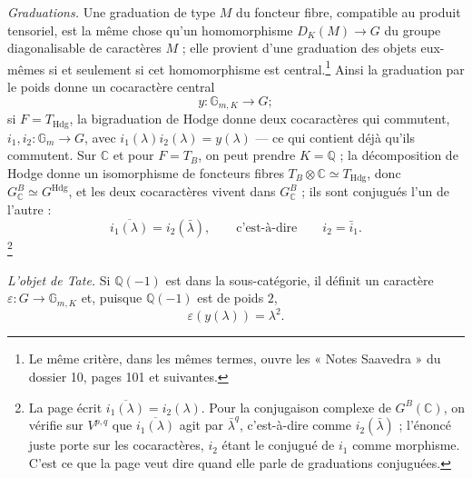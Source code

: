 \documentclass[11pt,a4paper]{article}
\begin{document}
\emph{Graduations.} Une graduation de type $M$ du foncteur fibre, compatible au
produit tensoriel, est la même chose qu'un homomorphisme $D_{K}(M) \to G$ du
groupe diagonalisable de caractères $M$ ; elle provient d'une graduation des
objets eux-mêmes si et seulement si cet homomorphisme est central.\footnote{Le
même critère, dans les mêmes termes, ouvre les « Notes Saavedra » du dossier 10,
pages 101 et suivantes.} Ainsi la graduation par le poids donne
un cocaractère central
\[
y \colon \mathbb{G}_{m,K} \longrightarrow G ;
\]
si $F = T_{\mathrm{Hdg}}$, la bigraduation de Hodge donne deux cocaractères qui
commutent, $i_{1}, i_{2} \colon \mathbb{G}_{m} \to G$, avec $i_{1}(\lambda)
i_{2}(\lambda) = y(\lambda)$ --- ce qui contient déjà qu'ils commutent. Sur
$\mathbb{C}$ et pour $F = T_{B}$, on peut prendre $K = \mathbb{Q}$ ; la
décomposition de Hodge donne un isomorphisme de foncteurs fibres $T_{B} \otimes
\mathbb{C} \simeq T_{\mathrm{Hdg}}$, donc $G^{B}_{\mathbb{C}} \simeq
G^{\mathrm{Hdg}}$, et les deux cocaractères vivent dans $G^{B}_{\mathbb{C}}$ ;
ils sont conjugués l'un de l'autre :
\[
\overline{i_{1}(\lambda)} = i_{2}(\bar{\lambda}) , \qquad\text{c'est-à-dire}\qquad
i_{2} = \bar{i}_{1} .
\]\footnote{La page écrit $\overline{i_{1}(\lambda)} = i_{2}(\lambda)$. Pour la
conjugaison complexe de $G^{B}(\mathbb{C})$, on vérifie sur $V^{p,q}$ que
$\overline{i_{1}(\lambda)}$ agit par $\bar{\lambda}^{q}$, c'est-à-dire comme
$i_{2}(\bar{\lambda})$ ; l'énoncé juste porte sur les cocaractères, $i_{2}$
étant le conjugué de $i_{1}$ comme morphisme. C'est ce que la page veut dire
quand elle parle de graduations conjuguées.}

\emph{L'objet de Tate.} Si $\mathbb{Q}(-1)$ est dans la sous-catégorie, il
définit un caractère $\varepsilon \colon G \to \mathbb{G}_{m,K}$ et, puisque
$\mathbb{Q}(-1)$ est de poids $2$,
\[
\varepsilon(y(\lambda)) = \lambda^{2} .
\]
\end{document}

